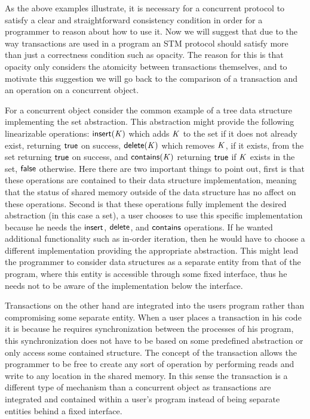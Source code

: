 As the above examples illustrate, it is necessary for a concurrent protocol
to satisfy a clear and straightforward consistency condition in order
for a programmer to reason about how to use it.
Now we will suggest that due to the way transactions are used in a program
an STM protocol should satisfy more than just a correctness condition
such as opacity.
The reason for this is that opacity only considers the atomicity between transactions themselves,
and to motivate this suggestion we will go back to the comparison of
a transaction and an operation on a concurrent object.

For a concurrent object consider the common example of a tree
data structure implementing the set abstraction.
This abstraction might provide the following linearizable operations:
$\act{insert}(\ms{K})$ which adds $\ms{K}$ to the set if it does not already exist, returning $\lit{true}$
on success, $\act{delete}(\ms{K})$ which removes $\ms{K}$, if it exists, from the set
returning $\lit{true}$ on success, and $\act{contains}(\ms{K})$ returning $\lit{true}$ if $\ms{K}$
exists in the set, $\lit{false}$ otherwise.
Here there are two important things to point out, first is that these operations
are contained to their data structure implementation, meaning that the status of shared
memory outside of the data structure has no affect on these operations.
Second is that these operations fully implement the desired abstraction
(in this case a set),
a user chooses to use this specific implementation because he needs
the $\act{insert}$, $\act{delete}$, and $\act{contains}$ operations.
If he wanted additional functionality such as in-order iteration, then
he would have to choose a different implementation providing the appropriate
abstraction.
This might lead the programmer to consider data structures as a separate entity
from that of the program, where this entity is accessible through some fixed
interface, thus he needs not to be aware of the implementation below the interface.

Transactions on the other hand are integrated into the users program
rather than compromising some separate entity.
When a user places a transaction in his code it is because he requires
synchronization between the processes of his program, this synchronization
does not have to be based on some predefined abstraction or only access
some contained structure.
The concept of the transaction allows the programmer to be free to
create any sort of operation by performing reads and write to any
location in the shared memory.
In this sense the transaction is a different type of mechanism
than a concurrent object as transactions are integrated and contained within
a user's program instead of being separate entities behind
a fixed interface.

